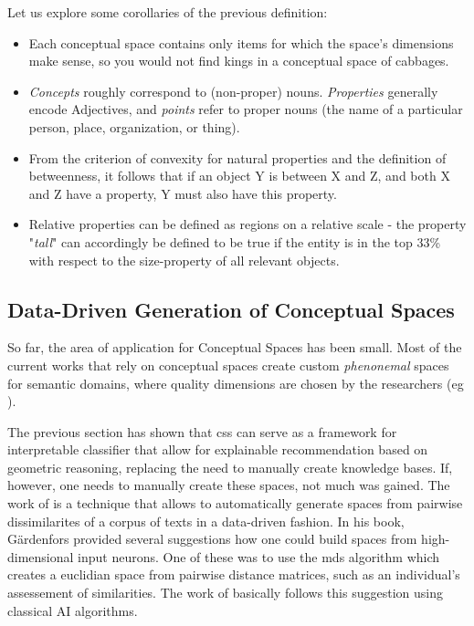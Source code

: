 Let us explore some corollaries of the previous definition:

\begin{itemize}
    \item Each conceptual space contains only items for which the space's dimensions make sense, so you would not find kings in a conceptual space of cabbages.
    \item \textit{Concepts} roughly correspond to (non-proper) nouns. \textit{Properties} generally encode Adjectives, and \textit{points} refer to proper nouns (the name of \eg a particular person, place, organization, or thing).
    \item From the criterion of convexity for natural properties and the definition of betweenness, it follows that if an object Y is between X and Z, and both X and Z have a property, Y must also have this property.
    \item Relative properties can be defined as regions on a relative scale - the property "\textit{tall}" can accordingly be defined to be true if the entity is in the top 33\% with respect to the size-property of all relevant objects.
\end{itemize}


\subsection{Data-Driven Generation of Conceptual Spaces}
\label{sec:generate_cs}

So far, the area of application for Conceptual Spaces has been small. Most of the current works that rely on conceptual spaces create custom \textit{phenonemal} spaces for semantic domains, where quality dimensions are chosen by the researchers (eg \cite{Schockaert2011}). 

The previous section has shown that \glspl{cs} can serve as a framework for interpretable classifier that allow for explainable recommendation based on geometric reasoning, replacing the need to manually create knowledge bases. If, however, one needs to manually create these spaces, not much was gained. The work of \cite{Derrac2015} is a technique that allows to automatically generate spaces from pairwise dissimilarites of a corpus of texts in a data-driven fashion. In his book, Gärdenfors provided several suggestions how one could build spaces from high-dimensional input neurons. One of these was to use the \gls{mds} algorithm which creates a euclidian space from pairwise distance matrices, such as an individual's assessement of similarities. The work of \cite{Derrac2015} basically follows this suggestion using classical AI algorithms. %

